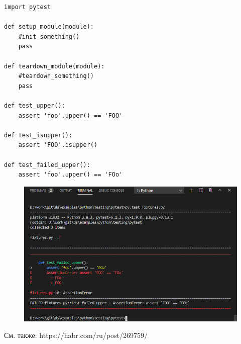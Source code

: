 \documentclass[xcolor=table]{beamer}
\begin{document}
\begin{frame}[t, fragile]
	\begin{verbatim}
import pytest

def setup_module(module):
    #init_something()
    pass
    
def teardown_module(module):
    #teardown_something()
    pass
    
def test_upper():
    assert 'foo'.upper() == 'FOO'
    
def test_isupper():
    assert 'FOO'.isupper()
    
def test_failed_upper():
    assert 'foo'.upper() == 'FOo'
	\end{verbatim}
\end{frame}

\begin{frame}[t, fragile]
	\begin{figure}[h]
		\centering
		\includegraphics[scale=0.6]{images/pytest_run.png}
	\end{figure}
	См. также: https://habr.com/ru/post/269759/
\end{frame}
\end{document}
